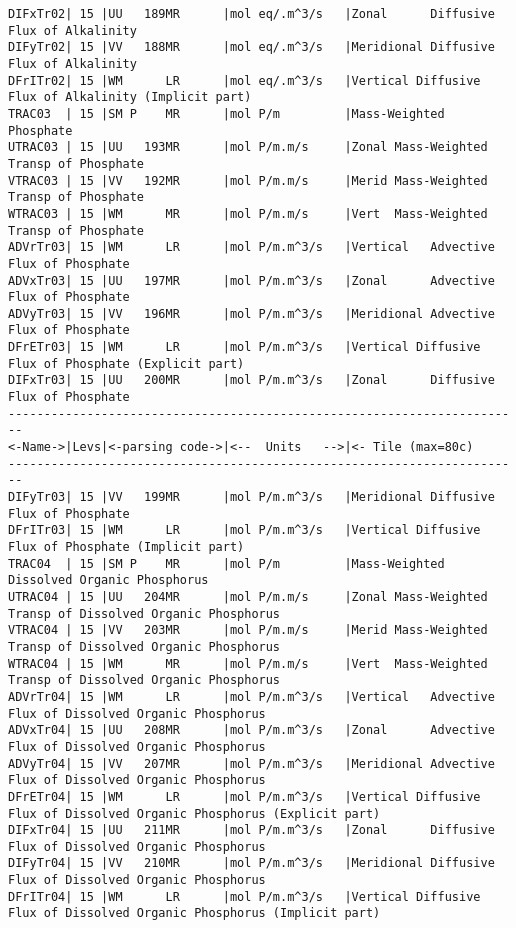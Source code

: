 {\begin{verbatim}
DIFxTr02| 15 |UU   189MR      |mol eq/.m^3/s   |Zonal      Diffusive Flux of Alkalinity
DIFyTr02| 15 |VV   188MR      |mol eq/.m^3/s   |Meridional Diffusive Flux of Alkalinity
DFrITr02| 15 |WM      LR      |mol eq/.m^3/s   |Vertical Diffusive Flux of Alkalinity (Implicit part)
TRAC03  | 15 |SM P    MR      |mol P/m         |Mass-Weighted Phosphate
UTRAC03 | 15 |UU   193MR      |mol P/m.m/s     |Zonal Mass-Weighted Transp of Phosphate
VTRAC03 | 15 |VV   192MR      |mol P/m.m/s     |Merid Mass-Weighted Transp of Phosphate
WTRAC03 | 15 |WM      MR      |mol P/m.m/s     |Vert  Mass-Weighted Transp of Phosphate
ADVrTr03| 15 |WM      LR      |mol P/m.m^3/s   |Vertical   Advective Flux of Phosphate
ADVxTr03| 15 |UU   197MR      |mol P/m.m^3/s   |Zonal      Advective Flux of Phosphate
ADVyTr03| 15 |VV   196MR      |mol P/m.m^3/s   |Meridional Advective Flux of Phosphate
DFrETr03| 15 |WM      LR      |mol P/m.m^3/s   |Vertical Diffusive Flux of Phosphate (Explicit part)
DIFxTr03| 15 |UU   200MR      |mol P/m.m^3/s   |Zonal      Diffusive Flux of Phosphate
------------------------------------------------------------------------
<-Name->|Levs|<-parsing code->|<--  Units   -->|<- Tile (max=80c) 
------------------------------------------------------------------------
DIFyTr03| 15 |VV   199MR      |mol P/m.m^3/s   |Meridional Diffusive Flux of Phosphate
DFrITr03| 15 |WM      LR      |mol P/m.m^3/s   |Vertical Diffusive Flux of Phosphate (Implicit part)
TRAC04  | 15 |SM P    MR      |mol P/m         |Mass-Weighted Dissolved Organic Phosphorus
UTRAC04 | 15 |UU   204MR      |mol P/m.m/s     |Zonal Mass-Weighted Transp of Dissolved Organic Phosphorus
VTRAC04 | 15 |VV   203MR      |mol P/m.m/s     |Merid Mass-Weighted Transp of Dissolved Organic Phosphorus
WTRAC04 | 15 |WM      MR      |mol P/m.m/s     |Vert  Mass-Weighted Transp of Dissolved Organic Phosphorus
ADVrTr04| 15 |WM      LR      |mol P/m.m^3/s   |Vertical   Advective Flux of Dissolved Organic Phosphorus
ADVxTr04| 15 |UU   208MR      |mol P/m.m^3/s   |Zonal      Advective Flux of Dissolved Organic Phosphorus
ADVyTr04| 15 |VV   207MR      |mol P/m.m^3/s   |Meridional Advective Flux of Dissolved Organic Phosphorus
DFrETr04| 15 |WM      LR      |mol P/m.m^3/s   |Vertical Diffusive Flux of Dissolved Organic Phosphorus (Explicit part)
DIFxTr04| 15 |UU   211MR      |mol P/m.m^3/s   |Zonal      Diffusive Flux of Dissolved Organic Phosphorus
DIFyTr04| 15 |VV   210MR      |mol P/m.m^3/s   |Meridional Diffusive Flux of Dissolved Organic Phosphorus
DFrITr04| 15 |WM      LR      |mol P/m.m^3/s   |Vertical Diffusive Flux of Dissolved Organic Phosphorus (Implicit part)

\end{verbatim}}
